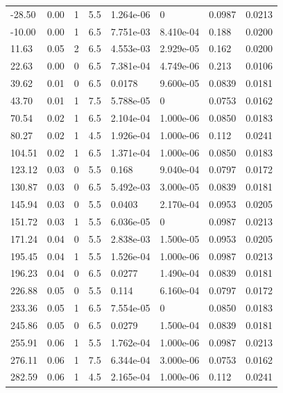 \documentclass[preview]{standalone}
\begin{document}
{{\begin{tabular}{L{1.2cm}C{1.2cm} C{0.3cm}C{0.5cm} C{1.4cm}C{1.4cm} C{1.4cm}C{1.4cm}}
  -28.50  &  0.00  & 1     & 5.5 &  1.264e-06  & 0  & 0.0987 &  0.0213   \\ 
  -10.00  &  0.00  & 1     & 6.5 &  7.751e-03  & 8.410e-04  & 0.188 &  0.0200   \\ 
  11.63  &  0.05  & 2     & 6.5 &  4.553e-03  & 2.929e-05  & 0.162 &  0.0200   \\ 
  22.63  &  0.00  & 0     & 6.5 &  7.381e-04  & 4.749e-06  & 0.213 &  0.0106   \\ 
  39.62  &  0.01  & 0     & 6.5 &  0.0178  & 9.600e-05  & 0.0839 &  0.0181   \\ 
  43.70  &  0.01  & 1     & 7.5 &  5.788e-05  & 0  & 0.0753 &  0.0162   \\ 
  70.54  &  0.02  & 1     & 6.5 &  2.104e-04  & 1.000e-06  & 0.0850 &  0.0183   \\ 
  80.27  &  0.02  & 1     & 4.5 &  1.926e-04  & 1.000e-06  & 0.112 &  0.0241   \\ 
  104.51  &  0.02  & 1     & 6.5 &  1.371e-04  & 1.000e-06  & 0.0850 &  0.0183   \\ 
  123.12  &  0.03  & 0     & 5.5 &  0.168  & 9.040e-04  & 0.0797 &  0.0172   \\ 
  130.87  &  0.03  & 0     & 6.5 &  5.492e-03  & 3.000e-05  & 0.0839 &  0.0181   \\ 
  145.94  &  0.03  & 0     & 5.5 &  0.0403  & 2.170e-04  & 0.0953 &  0.0205   \\ 
  151.72  &  0.03  & 1     & 5.5 &  6.036e-05  & 0  & 0.0987 &  0.0213   \\ 
  171.24  &  0.04  & 0     & 5.5 &  2.838e-03  & 1.500e-05  & 0.0953 &  0.0205   \\ 
  195.45  &  0.04  & 1     & 5.5 &  1.526e-04  & 1.000e-06  & 0.0987 &  0.0213   \\ 
  196.23  &  0.04  & 0     & 6.5 &  0.0277  & 1.490e-04  & 0.0839 &  0.0181   \\ 
  226.88  &  0.05  & 0     & 5.5 &  0.114  & 6.160e-04  & 0.0797 &  0.0172   \\ 
  233.36  &  0.05  & 1     & 6.5 &  7.554e-05  & 0  & 0.0850 &  0.0183   \\ 
  245.86  &  0.05  & 0     & 6.5 &  0.0279  & 1.500e-04  & 0.0839 &  0.0181   \\ 
  255.91  &  0.06  & 1     & 5.5 &  1.762e-04  & 1.000e-06  & 0.0987 &  0.0213   \\ 
  276.11  &  0.06  & 1     & 7.5 &  6.344e-04  & 3.000e-06  & 0.0753 &  0.0162   \\ 
  282.59  &  0.06  & 1     & 4.5 &  2.165e-04  & 1.000e-06  & 0.112 &  0.0241   \\ 

\end{tabular}}}
\end{document}
